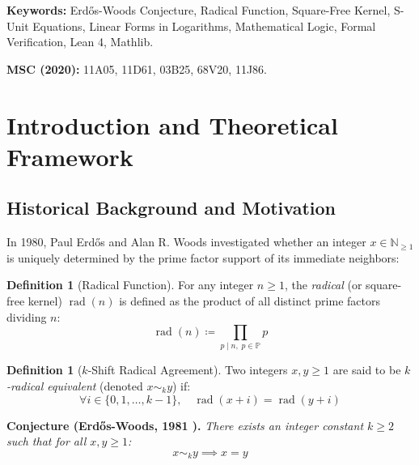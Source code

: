 \documentclass[11pt,a4paper]{article}
\theoremstyle{definition}
\newtheorem{definition}[theorem]{Definition}
\begin{document}
\vspace{0.5em}
\noindent\textbf{Keywords:} Erd\H{o}s-Woods Conjecture, Radical Function, Square-Free Kernel, S-Unit Equations, Linear Forms in Logarithms, Mathematical Logic, Formal Verification, Lean 4, Mathlib.

\noindent\textbf{MSC (2020):} 11A05, 11D61, 03B25, 68V20, 11J86.

\tableofcontents
\newpage

\section{Introduction and Theoretical Framework}

\subsection{Historical Background and Motivation}
In 1980, Paul Erd\H{o}s \cite{erdos1980} and Alan R. Woods \cite{woods1981thesis} investigated whether an integer $x \in \mathbb{N}_{\ge 1}$ is uniquely determined by the prime factor support of its immediate neighbors:

\begin{definition}[Radical Function]\label{def:radical}
For any integer $n \ge 1$, the \emph{radical} (or square-free kernel) $\operatorname{rad}(n)$ is defined as the product of all distinct prime factors dividing $n$:
\begin{equation}\label{eq:radical_def}
\operatorname{rad}(n) \coloneqq \prod_{p \mid n, \; p \in \mathbb{P}} p
\end{equation}
\end{definition}

\begin{definition}[$k$-Shift Radical Agreement]\label{def:k_agreement}
Two integers $x, y \ge 1$ are said to be \emph{$k$-radical equivalent} (denoted $x \sim_k y$) if:
\begin{equation}\label{eq:k_equiv}
\forall i \in \{0, 1, \dots, k - 1\}, \quad \operatorname{rad}(x + i) = \operatorname{rad}(y + i)
\end{equation}
\end{definition}

\noindent\textbf{Conjecture (Erd\H{o}s-Woods, 1981 \cite{woods1981thesis}).} \textit{There exists an integer constant $k \ge 2$ such that for all $x, y \ge 1$:}
\begin{equation}\label{eq:ew_conj}
x \sim_k y \implies x = y
\end{equation}
\end{document}
